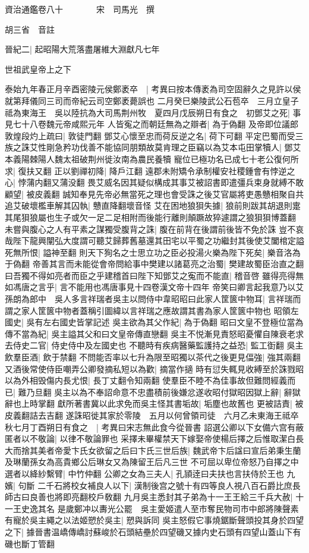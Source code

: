 資治通鑑卷八十　　　　宋　司馬光　撰

胡三省　音註

晉紀二|{
	起昭陽大荒落盡屠維大淵獻凡七年}


世祖武皇帝上之下

泰始九年春正月辛酉密陵元侯鄭袤卒　|{
	考異曰按本傳袤為司空固辭久之見許以侯就第拜儀同三司而帝紀云司空鄭袤薨誤也}
二月癸巳樂陵武公石苞卒　三月立皇子祗為東海王　吳以陸抗為大司馬荆州牧　夏四月戊辰朔日有食之　初鄧艾之死|{
	事見七十八卷魏元帝咸熙元年}
人皆寃之而朝廷無為之辯者|{
	為于偽翻}
及帝即位議郎敦煌段灼上疏曰|{
	敦徒門翻}
鄧艾心懷至忠而荷反逆之名|{
	荷下可翻}
平定巴蜀而受三族之誅艾性剛急矜功伐善不能協同朋類故莫肯理之臣竊以為艾本屯田掌犢人|{
	鄧艾本義陽棘陽人魏太祖破荆州徙汝南為農民養犢}
寵位已極功名已成七十老公復何所求|{
	復扶又翻}
正以劉禪初降|{
	降戶江翻}
遠郡未附矯令承制權安社稷鍾會有悖逆之心|{
	悖蒲内翻又蒲没翻}
畏艾威名因其疑似構成其事艾被詔書即遣彊兵束身就縛不敢顧望|{
	被皮義翻}
誠知奉見先帝必無當死之理也會受誅之後艾官屬將吏愚戇相聚自共追艾破壞檻車解其囚執|{
	戇直降翻壞音怪}
艾在困地狼狽失據|{
	狼前則跋其胡退則疐其尾狽狼屬也生子或欠一足二足相附而後能行離則顛蹶故猝遽謂之狼狽狽博蓋翻}
未嘗與腹心之人有平素之謀獨受腹背之誅|{
	腹在前背在後謂前後皆不免於誅}
豈不哀哉陛下龍興闡弘大度謂可聽艾歸葬舊墓還其田宅以平蜀之功繼封其後使艾闔棺定謚死無所恨|{
	謚神至翻}
則天下狥名之士思立功之臣必投湯火樂為陛下死矣|{
	樂音洛為于偽翻}
帝善其言而未能從會帝問給事中樊建以諸葛亮之治蜀|{
	樊建故蜀臣治直之翻}
曰吾獨不得如亮者而臣之乎建稽首曰陛下知鄧艾之寃而不能直|{
	稽音啓}
雖得亮得無如馮唐之言乎|{
	言不能用也馮唐事見十四卷漢文帝十四年}
帝笑曰卿言起我意乃以艾孫朗為郎中　吳人多言祥瑞者吳主以問侍中韋昭昭曰此家人筐篋中物耳|{
	言祥瑞而謂之家人筐篋中物者蓋稱引圖緯以言祥瑞之應故謂其書為家人筐篋中物也}
昭領左國史|{
	吳有左右國史皆掌記述}
吳主欲為其父作紀|{
	為于偽翻}
昭曰文皇不登極位當為傳不當為紀|{
	吳主謚其父和曰文皇帝傳直戀翻}
吳主不悦漸見責怒昭憂懼自陳衰老求去侍史二官|{
	侍史侍中及左國史也}
不聽時有疾病醫藥監護持之益恐|{
	監工衘翻}
吳主飲羣臣酒|{
	飲于禁翻}
不問能否率以七升為限至昭獨以茶代之後更見偪強|{
	強其兩翻}
又酒後常使侍臣嘲弄公卿發摘私短以為歡|{
	摘當作擿}
時有愆失輒見收縛至於誅戮昭以為外相毁傷内長尤恨|{
	長丁丈翻令知兩翻}
使羣臣不睦不為佳事故但難問經義而已|{
	難乃旦翻}
吳主以為不奉詔命意不忠盡積前後嫌忿遂收昭付獄昭因獄上辭|{
	辭獄辭也上時掌翻}
獻所著書冀以此求免而吳主怪其書垢故|{
	垢塵也故舊也}
更被詰責|{
	被皮義翻詰去吉翻}
遂誅昭徙其家於零陵　五月以何曾領司徒　六月乙未東海王祗卒　秋七月丁酉朔日有食之　|{
	考異曰宋志無此食今從晉書}
詔選公卿以下女備六宫有蔽匿者以不敬論|{
	以律不敬論罪也}
采擇未畢權禁天下嫁娶帝使楊后擇之后惟取潔白長大而捨其美者帝愛卞氏女欲留之后曰卞氏三世后族|{
	魏武帝卞后諡曰宣后弟秉生蘭及琳蘭孫女為高貴鄉公后琳女又為陳留王后凡三世}
不可屈以卑位帝怒乃自擇之中選者以絳紗繫臂|{
	中竹仲翻}
公卿之女為三夫人|{
	孔頴逹曰夫扶也言扶侍於王也}
九嬪|{
	句斷}
二千石將校女補良人以下|{
	漢制後宫之號十有四等良人視八百石爵比庶長師古曰良善也將即亮翻校戶敎翻}
九月吳主悉封其子弟為十一王王給三千兵大赦|{
	十一王史逸其名}
是歲鄭冲以夀光公罷　吳主愛姬遣人至市奪民物司市中郎將陳聲素有寵於吳主繩之以法姬愬於吳主|{
	愬與訴同}
吳主怒假它事燒鋸斷聲頭投其身於四望之下|{
	據晉書温嶠傳嶠討蘇峻於石頭結壘於四望磯又據内史石頭有四望山蓋山下有磯也斷丁管翻}


